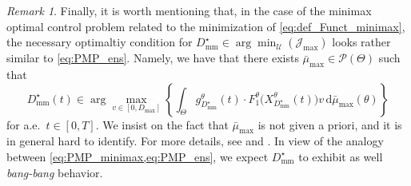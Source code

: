\documentclass[a4paper,12pt, reqno]{amsart}
\theoremstyle{plain}
\theoremstyle{definition}
\theoremstyle{remark}
\newtheorem{remark}{Remark}
\numberwithin{equation}{section}
\newcommand{\J}{\mathcal{J}}
\newcommand{\U}{\mathcal{U}}
\newcommand{\de}{\,\mathrm{d}}
\begin{document}
{\begin{remark}
    Finally, it is worth mentioning that, in the case of the minimax optimal control problem related to the minimization of \cref{eq:def_Funct_minimax}, the necessary optimaltiy condition for $D^\star_{\mathrm{mm}} \in \arg\min_\U (\J_{\max})$ looks rather similar to \cref{eq:PMP_ens}. Namely, we have that there exists $\bar \mu_{\max} \in \mathcal{P}(\Theta)$ such that
    \begin{equation} \label{eq:PMP_minimax}
        D^\star_{\mathrm{mm}} (t) \in \arg\max_{v\in [0,D_{\max}]} \left\{ \int_{\Theta} g^\theta_{D^\star_{\mathrm{mm}}}(t) \cdot F_1^\theta\big( X_{D^\star_{\mathrm{mm}}}^\theta(t) \big) v \de \bar \mu_{\max}(\theta) \right\}
    \end{equation}
    for a.e.~$t\in [0,T]$. We insist on the fact that $\bar \mu_{\max}$ is not given a priori, and it is in general hard to identify. For more details, see \cite{Vinter2005} and \cite[Remark~5.10]{Scag25}.
    In view of the analogy between \cref{eq:PMP_minimax,eq:PMP_ens}, we expect $D^\star_{\mathrm{mm}}$ to exhibit as well \emph{bang-bang} behavior.
\end{remark}
}
\end{document}
